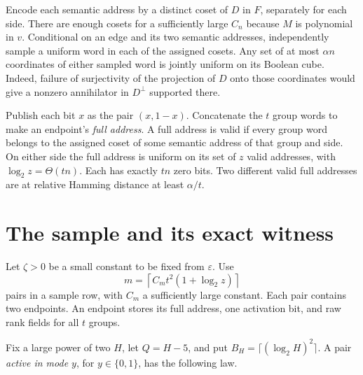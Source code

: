 \documentclass[11pt]{article}
\begin{document}
Encode each semantic address by a distinct coset of $D$ in $F$,
separately for each side. There are enough cosets for a sufficiently
large $C_n$ because $M$ is polynomial in $v$. Conditional on an edge
and its two semantic addresses, independently sample a uniform word in
each of the assigned cosets. Any set of at most $\alpha n$ coordinates
of either sampled word is jointly uniform on its Boolean cube.
Indeed, failure of surjectivity of the projection of $D$ onto those
coordinates would give a nonzero annihilator in $D^\perp$ supported there.

Publish each bit $x$ as the pair $(x,1-x)$. Concatenate the $t$ group
words to make an endpoint's \emph{full address}. A full address is valid
if every group word belongs to the assigned coset of some semantic
address of that group and side. On either side the full address is uniform
on its set of $z$ valid addresses, with $\log_2 z=\Theta(tn)$.
Each has exactly $tn$ zero bits. Two different valid full addresses
are at relative Hamming distance at least $\alpha/t$.

\section{The sample and its exact witness}\label{sec:construction}

Let \(\zeta>0\) be a small constant to be fixed from \(\varepsilon\).
Use
\begin{equation}\label{eq:m}
  m=\left\lceil C_m t^2(1+\log_2 z)\right\rceil
\end{equation}
pairs in a sample row, with $C_m$ a sufficiently large constant.
Each pair contains two endpoints. An endpoint stores its full address,
one activation bit, and raw rank fields for all $t$ groups.

Fix a large power of two $H$, let $Q=H-5$, and put
$B_H=\lceil(\log_2 H)^2\rceil$. A pair \emph{active in mode $y$}, for
$y\in\{0,1\}$, has the following law.
\end{document}
